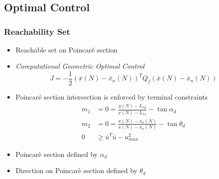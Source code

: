 \section*{}
\subsection*{Optimal Control}
\begin{frame} %
\frametitle{Reachability Set}
  \begin{itemize}
  \item Reachable set on Poincar\'e section
  \item \emph{Computational Geometric Optimal Control}
  \begin{equation*}
	J = -\frac{1}{2} \left( \bar{x}(N) - \bar{x}_{n}(N)\right)^T 
	Q_f
	\left( \bar{x}(N) - \bar{x}_{n}(N)\right)
	\label{eq:cost}
\end{equation*}
  \item Poincar\'e section intersection is enforced by terminal constraints
\begin{align*}
	m_1 &= 0 = \frac{y(N) - L_{1y}}{x(N) - L_{1x}} - \tan{\alpha_d} \\ 
    m_2&= 0 = \frac{\dot{x}(N) - \dot{x_n}(N) }{x(N) -x_n(N) } - \tan{\theta_d} \\
	 0 &\geq\bar{u}^T \bar{u} - u_{max}^2 
\end{align*}
	\item Poincar\`e section defined by \( \alpha_d \)
	\item Direction on Poincar\`e section defined by \( \theta_d \)
 \end{itemize}
\end{frame}   %

